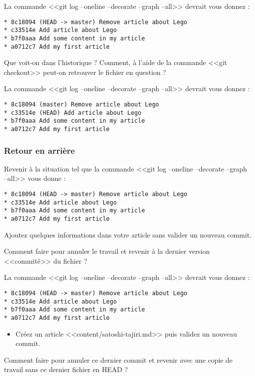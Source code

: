 \documentclass[a4paper]{article}
\begin{document}
La commande <<git log --oneline --decorate --graph --all>> devrait vous donnez :
\begin{verbatim}
* 8c18094 (HEAD -> master) Remove article about Lego
* c33514e Add article about Lego
* b7f0aaa Add some content in my article
* a0712c7 Add my first article
\end{verbatim}

Que voit-on dans l'historique ?
Comment, à l'aide de la commande <<git checkout>> peut-on retrouver le fichier en question ?

La commande <<git log --oneline --decorate --graph --all>> devrait vous donnez :
\begin{verbatim}
* 8c18094 (master) Remove article about Lego
* c33514e (HEAD) Add article about Lego
* b7f0aaa Add some content in my article
* a0712c7 Add my first article
\end{verbatim}

\subsubsection{Retour en arrière}

Revenir à la situation tel que la commande <<git log --oneline --decorate --graph --all>> vous donne :
\begin{verbatim}
* 8c18094 (HEAD -> master) Remove article about Lego
* c33514e Add article about Lego
* b7f0aaa Add some content in my article
* a0712c7 Add my first article
\end{verbatim}

Ajoutez quelques informations dans votre article sans valider un nouveau commit.

Comment faire pour annuler le travail et revenir à la dernier version <<commité>> du fichier ?

La commande <<git log --oneline --decorate --graph --all>> devrait vous donnez :
\begin{verbatim}
* 8c18094 (HEAD -> master) Remove article about Lego
* c33514e Add article about Lego
* b7f0aaa Add some content in my article
* a0712c7 Add my first article
\end{verbatim}

\begin{itemize}
  \item Créez un article <<content/satoshi-tajiri.md>> puis validez un nouveau commit.
\end{itemize}

Comment faire pour annuler ce dernier commit et revenir avec une copie de travail sans ce dernier fichier en HEAD ?
\end{document}

